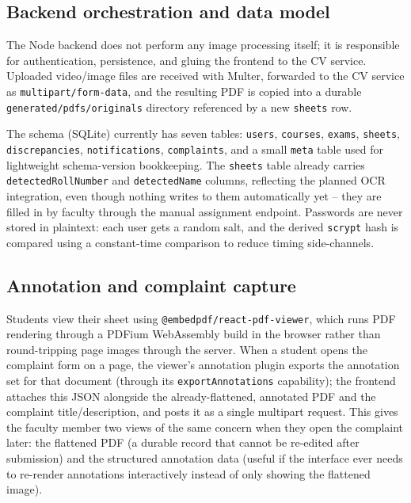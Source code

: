 \documentclass[11pt,a4paper]{article}
\begin{document}
\subsection{Backend orchestration and data model}

The Node backend does not perform any image processing itself; it is
responsible for authentication, persistence, and gluing the frontend to the
CV service. Uploaded video/image files are received with Multer, forwarded
to the CV service as \texttt{multipart/form-data}, and the resulting PDF is
copied into a durable \texttt{generated/pdfs/originals} directory referenced
by a new \texttt{sheets} row.

The schema (SQLite) currently has seven tables: \texttt{users},
\texttt{courses}, \texttt{exams}, \texttt{sheets}, \texttt{discrepancies},
\texttt{notifications}, \texttt{complaints}, and a small \texttt{meta} table
used for lightweight schema-version bookkeeping. The \texttt{sheets} table
already carries \texttt{detectedRollNumber} and \texttt{detectedName}
columns, reflecting the planned OCR integration, even though nothing writes
to them automatically yet -- they are filled in by faculty through the
manual assignment endpoint. Passwords are never stored in plaintext:
each user gets a random salt, and the derived \texttt{scrypt} hash is
compared using a constant-time comparison to reduce timing side-channels.

\subsection{Annotation and complaint capture}

Students view their sheet using \texttt{@embedpdf/react-pdf-viewer}, which
runs PDF rendering through a PDFium WebAssembly build in the browser rather
than round-tripping page images through the server. When a student opens the
complaint form on a page, the viewer's annotation plugin exports the
annotation set for that document (through its \texttt{exportAnnotations}
capability); the frontend attaches this JSON alongside the already-flattened,
annotated PDF and the complaint title/description, and posts it as a single
multipart request. This gives the faculty member two views of the same
concern when they open the complaint later: the flattened PDF (a durable
record that cannot be re-edited after submission) and the structured
annotation data (useful if the interface ever needs to re-render annotations
interactively instead of only showing the flattened image).
\end{document}
